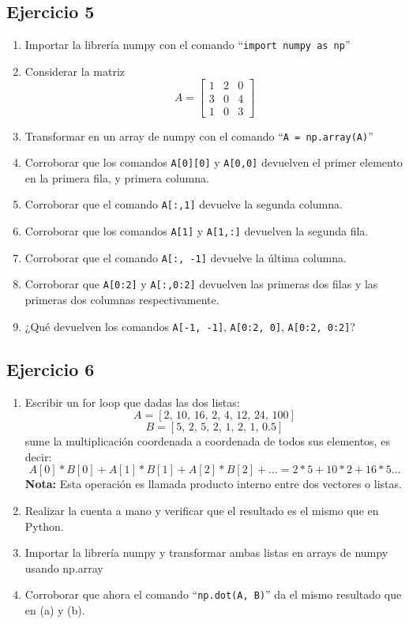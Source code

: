 \documentclass[12pt]{article}
\begin{document}
\subsection{Ejercicio 5}

\begin{enumerate}[label=\alph*)]
    \item Importar la librería numpy con el comando ``\texttt{import numpy as np}''
    \item Considerar la matriz  
    \[
    A = \begin{bmatrix}
    1 & 2 & 0\\[4pt]
    3 & 0 & 4\\[4pt]
    1 & 0 & 3
    \end{bmatrix}
    \]
    \item Transformar en un array de numpy con el comando ``\texttt{A = np.array(A)}''
    \item Corroborar que los comandos \texttt{A[0][0]} y \texttt{A[0,0]} devuelven el primer elemento en la primera fila, y primera columna.
    \item Corroborar que el comando \texttt{A[:,1]} devuelve la segunda columna.
    \item Corroborar que los comandos \texttt{A[1]} y \texttt{A[1,:]} devuelven la segunda fila.
    \item Corroborar que el comando \texttt{A[:, -1]} devuelve la última columna.
    \item Corroborar que \texttt{A[0:2]} y \texttt{A[:,0:2]} devuelven las primeras dos filas y las primeras dos columnas respectivamente.
    \item ¿Qué devuelven los comandos \texttt{A[-1, -1]}, \texttt{A[0:2, 0]}, \texttt{A[0:2, 0:2]}?
\end{enumerate}

    
\subsection{Ejercicio 6}
\begin{enumerate}[label=\alph*)]
    \item Escribir un for loop que dadas las dos listas:
    \[
    A = [2,\, 10,\, 16,\, 2,\, 4,\, 12,\, 24,\, 100]
    \]
    \[
    B = [5,\, 2,\, 5,\, 2,\, 1,\, 2,\, 1,\, 0.5]
    \]
    sume la multiplicación coordenada a coordenada de todos sus elementos, es decir:
    \[
    A[0]*B[0] + A[1]*B[1] + A[2]*B[2] + \dots = 2*5 + 10*2 + 16*5 \dots
    \]
    \textbf{Nota: }Esta operación es llamada producto interno entre dos vectores o listas.
    \item Realizar la cuenta a mano y verificar que el resultado es el mismo que en Python.
    \item Importar la librería numpy y transformar ambas listas en arrays de numpy usando np.array
    \item Corroborar que ahora el comando ``\texttt{np.dot(A, B)}'' da el mismo resultado que en (a) y (b).
\end{enumerate}
    
\end{document}
